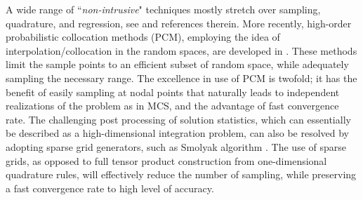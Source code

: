 A wide range of ``\textit{non-intrusive}" techniques mostly stretch over sampling, quadrature, and regression, see \cite{owen2017comparison} and references therein. More recently, high-order probabilistic collocation methods (PCM), employing the idea of interpolation/collocation in the random spaces, are developed in \cite{xiu2005high,babuvska2007stochastic,nobile2008sparse}. These methods limit the sample points to an efficient subset of random space, while adequately sampling the necessary range. The excellence in use of PCM is twofold; it has the benefit of easily sampling at nodal points that naturally leads to independent realizations of the problem as in MCS, and the advantage of fast convergence rate. The challenging post processing of solution statistics, which can essentially be described as a high-dimensional integration problem, can also be resolved by adopting sparse grid generators, such as Smolyak algorithm \cite{nobile2008sparse,Smolyak63}. The use of sparse grids, as opposed to full tensor product construction from one-dimensional quadrature rules, will effectively reduce the number of sampling, while preserving a fast convergence rate to high level of accuracy. %






